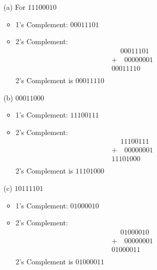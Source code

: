 \documentclass{article}
\begin{document}
\begin{enumerate}
    \item[(a)]For \(11100010\)
        \begin{itemize}
            \item 1’s Complement: \(00011101\)
	    \item 2's Complement:
                  \[
                  \begin{array}{r}
                    \phantom{+}00011101 \\
                    +\quad 00000001 \\
                    \hline
                    00011110 \\
                  \end{array}
                  \]
             2's Complement is \(00011110\)
        \end{itemize}

    \item[(b)] \(00011000\)
        \begin{itemize}
            \item 1’s Complement: \(11100111\)
	    \item 2's Complement:
                  \[
                  \begin{array}{r}
                    \phantom{+}11100111 \\
                    +\quad 00000001 \\
                    \hline
                    11101000 \\
                  \end{array}
                  \]
            2’s Complement is \(11101000\)
        \end{itemize}

    \item[(c)] \(10111101\)
        \begin{itemize}
            \item 1’s Complement: \(01000010\)
	    \item 2's Complement:
                  \[
                  \begin{array}{r}
                    \phantom{+}01000010 \\
                    +\quad 00000001 \\
                    \hline
                    01000011 \\
                  \end{array}
                  \]
            2’s Complement is \(01000011\)
        \end{itemize}


\end{enumerate}
\end{document}
